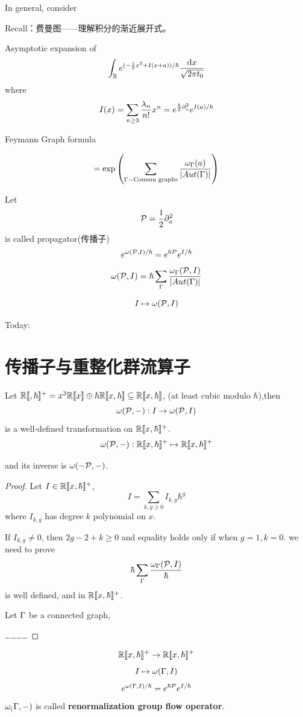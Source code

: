 In general, consider


Recall：费曼图——理解积分的渐近展开式。

Asymptotic expansion of 
$$\int_{\mathbb{R}} e^{(-\frac{1}{2}x^2+I(x+a))/\hbar}\frac{\mathrm{d} x}{\sqrt{2\pi t_0}}$$
where
$$I(x)=\sum_{n\geq 3}\frac{\lambda_n}{n!}x^n
=e^{\frac{\hbar}{2}\partial_x^2}e^{I(a)/\hbar}$$

Feymann Graph formula

$$=\exp\left(\sum_{\Gamma-\text{Commu graphs}}
\frac{\omega_\Gamma(a)}{|Aut(\Gamma)|}\right)$$

Let
$$\mathcal{P}=\frac{1}{2}\partial_a^2$$
is called propagator(传播子)
$$e^{\omega(\mathcal{P},I)/\hbar}=e^{\hbar\mathcal{P}}e^{I/\hbar}$$
$$\omega(\mathcal{P},I)=\hbar\sum_{\Gamma}\frac{\omega_\Gamma(\mathcal{P},I)}{|Aut(\Gamma)|}$$

$$I\mapsto\omega(\mathcal{P},I)$$ 


Today:
\section{传播子与重整化群流算子}

\begin{prop}
Let $\bbR\fps{,\hbar}^+=x^3\bbR\fps{x}\oplus\hbar\bbR\fps{x,\hbar}\subseteq\bbR\fps{x,\hbar}$,
(at least cubic modulo $\hbar$),then 
$$\omega(\mathcal{P},-):I\to\omega(\mathcal{P},I)$$
is a well-defined transformation on $\mathbb{R}[\![x,\hbar]\!]^+$.
$$\omega(\mathcal{P},-):\mathbb{R}[\![x,\hbar]\!]^+\mapsto\mathbb{R}[\![x,\hbar]\!]^+$$

and its inverse is $\omega(-\mathcal{P},-)$. 
\end{prop}

\begin{proof}
Let $I\in\mathbb{R}[\![x,\hbar]\!]^+$,
$$I=\sum_{k,g\geq 0}I_{k,g}\hbar^g$$
where $I_{k,g}$ has degree $k$ polynomial on $x$.

If $I_{k,g}\neq 0$, then $2g-2+k\geq 0$ 
and equality holds only if when $g=1,k=0$.
we need to prove 
$$\hbar\sum_{\Gamma}\frac{\omega_\Gamma(\mathcal{P},I)}{\hbar}$$
is well defined, and in $\mathbb{R}[\![x,\hbar]\!]^+$.

Let $\Gamma$ be a connected graph,

…………
\end{proof}

$$\mathbb{R}[\![x,\hbar]\!]^+\to \mathbb{R}[\![x,\hbar]\!]^+$$
$$I\mapsto\omega(\Gamma,I)$$
$$e^{\omega(\Gamma,I)/\hbar}=e^{\hbar\mathcal{P}}e^{I/\hbar}$$
$\omega_(\Gamma,-)$ is called \textbf{renormalization group flow operator}.

